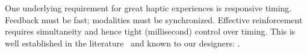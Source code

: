 \noindent
One underlying requirement for great haptic experiences is responsive timing.
Feedback must be fast; modalities must be synchronized.
Effective reinforcement requires simultaneity and hence tight (millisecond) control over timing.
This is well established in the literature~\citep{levitin2000perception,Kaaresoja2014} and known to our designers:
.

